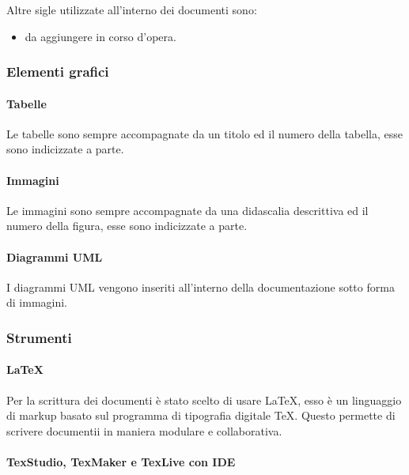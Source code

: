 				Altre sigle utilizzate all'interno dei documenti sono:
				\begin{itemize}
					\item da aggiungere in corso d'opera.
				\end{itemize}

		\subsubsection{Elementi grafici}
			\paragraph{Tabelle}
				Le tabelle sono sempre accompagnate da un titolo ed il numero della tabella, esse sono indicizzate a parte.
			\paragraph{Immagini}
				Le immagini sono sempre accompagnate da una didascalia descrittiva ed il numero della figura, esse sono indicizzate a parte.
			\paragraph{Diagrammi UML}
				I diagrammi UML vengono inseriti all'interno della documentazione sotto forma di immagini.
		\subsubsection{Strumenti}
			\paragraph{LaTeX}
				Per la scrittura dei documenti è stato scelto di usare \LaTeX{}, esso è un linguaggio di markup basato sul programma di tipografia digitale \TeX{}. Questo permette di scrivere documentii in maniera modulare e collaborativa.
			\paragraph{TexStudio, TexMaker e TexLive con IDE}
